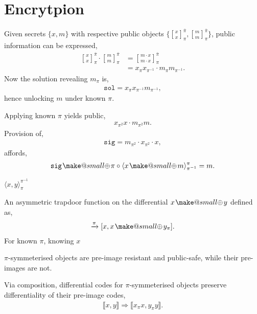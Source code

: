 \documentclass[twocolumn, aps, amsmath, amssymb, nofootinbib, superscriptaddress, longbibliography, doublefloatfix, table-of-contents, eqsecnum, rmp]{revtex4-2}
\makeatletter
\def\diff#1#2{\llbracket #1,#2\rrbracket}
\def\braid#1#2#3#4{\langle#1,#2\rangle_{#3}^{#4}}
\def\selfbraid#1#2#3{\langle#1\rangle_{#2}^{#3}}
\newcommand{\stackbraid}[2]{{\genfrac{[}{]}{0pt}{}{{#1}}{{#2}}}^{\bar{\pi}}_{\pi}}
\newcommand{\soplus}{{{\hspace{1pt}}{\mathbin{\mathpalette\make@small{\mathbin\oplus}}}}{\hspace{1pt}}}
\newcommand{\make@small}[2]{%
  \vcenter{\hbox{%
    \scalebox{0.6}{$\m@th#1#2$}%
  }}%
}
\makeatother
\begin{document}
\section{Encrytpion}

Given secrets $\{x,m\}$ with respective public objects $\{\stackbraid{x}{x},\stackbraid{m}{m}\}$, public information can be expressed,
\begin{align}
	\stackbraid{x}{x} \cdot \stackbraid{m}{m} &= \stackbraid{m\cdot x}{m\cdot x} \nonumber\\
	&= x_{\pi}x_{\pi^{-1}} \cdot m_\pi m_{\pi^{-1}}.
\end{align}
Now the solution revealing $m_\pi$ is,
\begin{align}
	\mathtt{sol} = x_\pi x_{\pi^{-1}} m_{\pi^{-1}},
\end{align}
hence unlocking $m$ under known $\pi$.


Applying known $\pi$ yields public,
\begin{align}
	x_{\pi^2}x \cdot m_{\pi^2} m.
\end{align}
Provision of,
\begin{align}
	\mathtt{sig} = m_{\pi^2} \cdot x_{\pi^2} \cdot x,
\end{align}
affords,
\begin{align}
	\mathtt{sig} \soplus \pi \circ \selfbraid{x\soplus m}{\pi^{-1}}{\pi} = m.
\end{align}

$\braid{x}{y}{\pi}{\pi^{-1}}$


An asymmetric trapdoor function on the differential $x\soplus y$ defined as,
\begin{align}
	[x,x\soplus y] \xrightarrow{\pi} [x, x \soplus y_\pi].
\end{align}
For known $\pi$, knowing $x$

$\pi$-symmeterised objects are pre-image resistant and public-safe, while their pre-images are not.

Via composition, differential codes for $\pi$-symmeterised objects preserve differentiality of their pre-image codes,
\begin{align}
	\diff{x}{y} \Rightarrow \diff{x_\pi x}{y_\pi y}.
\end{align}
\end{document}
